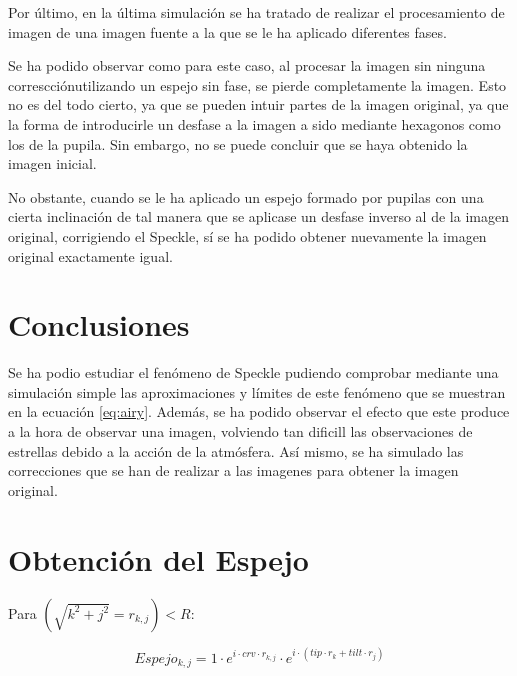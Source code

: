 \documentclass[twoside]{article}
\begin{document}
\begin{multicols}{2}
			Por último, en la última simulación se ha tratado de realizar el procesamiento de imagen de una imagen fuente a la que se le ha aplicado diferentes fases. 

			Se ha podido observar como para este caso, al procesar la imagen sin ninguna correscciónutilizando un espejo sin fase, se pierde completamente la imagen. Esto no es del todo cierto, ya que se pueden intuir partes de la imagen original, ya que la forma de introducirle un desfase a la imagen a sido mediante hexagonos como los de la pupila. Sin embargo, no se puede concluir que se haya obtenido la imagen inicial.

			No obstante, cuando se le ha aplicado un espejo formado por pupilas con una cierta inclinación de tal manera que se aplicase un desfase inverso al de la imagen original, corrigiendo el Speckle, sí se ha podido obtener nuevamente la imagen original exactamente igual.

		\section{Conclusiones}

			Se ha podio estudiar el fenómeno de Speckle pudiendo comprobar mediante una simulación simple las aproximaciones y límites de este fenómeno que se muestran en la ecuación \ref{eq:airy}. Además, se ha podido observar el efecto que este produce a la hora de observar una imagen, volviendo tan dificill las observaciones de estrellas debido a la acción de la atmósfera. Así mismo, se ha simulado las correcciones que se han de realizar a las imagenes para obtener la imagen original.

	\end{multicols}


\newpage

	    \appendix

		    	\section{Obtención del Espejo}
		    		\label{appen:Espejo}

					Para  $(\sqrt{k^2+j^2}=r_{k,j}) < R$:

						\begin{equation}
							Espejo_{k, j} = 1 \cdot e^{i\cdot crv \cdot r_{k,j}} \cdot e^{i\cdot (tip\cdot r_k + tilt \cdot r_j)}
						\end{equation}
						
\end{document}
